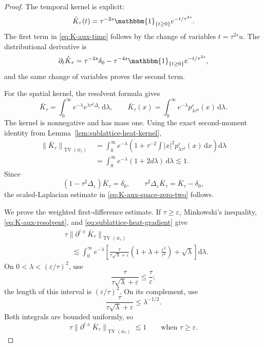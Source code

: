 \documentclass{article}
\numberwithin{equation}{section}
\newcommand{\mathd}{\mathrm{d}}
\theoremstyle{plain}
\theoremstyle{definition}
\begin{document}
\begin{proof}
	The temporal kernel is explicit:
	\[
		\mathring K_\tau(t)
	=
	\tau^{-2s}\mathbbm{1}_{\{t\geq0\}}
	e^{-t/\tau^{2s}}.
	\]
	The first term in \eqref{eq:K-aux-time} follows by the change of variables
	\(t=\tau^{2s}u\).  The distributional derivative is
	\[
		\partial_t\mathring K_\tau
	=
	\tau^{-2s}\delta_0
	-
	\tau^{-4s}\mathbbm{1}_{\{t\geq0\}}
	e^{-t/\tau^{2s}},
	\]
	and the same change of variables proves the second term.
	
	For the spatial kernel, the resolvent formula gives
	\begin{equation}
		\label{eq:K-aux-resolvent}
		\bar K_\tau
		=
		\int_0^\infty e^{-\lambda}
		e^{\lambda\tau^2\Delta_\varepsilon}\,\mathd\lambda,
		\qquad
		\bar K_\tau(x)
		=
		\int_0^\infty e^{-\lambda}
		p_{\lambda\tau^2}^\varepsilon(x)\,\mathd\lambda.
	\end{equation}
	The kernel is nonnegative and has mass one.  Using the exact
	second-moment identity from Lemma~\ref{lem:sublattice-heat-kernel},
	\[
	\begin{aligned}
		\|\bar K_\tau\|_{\operatorname{TV}(\bar w_\tau)}
		&=
		\int_0^\infty e^{-\lambda}
		\left(
		1+\tau^{-2}
		\int|x|^2p_{\lambda\tau^2}^\varepsilon(x)\,\mathd x
		\right)\mathd\lambda
		\\
		&=
		\int_0^\infty e^{-\lambda}(1+2d\lambda)\,\mathd\lambda
		\lesssim1.
	\end{aligned}
	\]
	Since
	\[
	(1-\tau^2\Delta_\varepsilon)\bar K_\tau=\delta_0,
	\qquad
	\tau^2\Delta_\varepsilon\bar K_\tau
	=
	\bar K_\tau-\delta_0,
	\]
	the scaled-Laplacian estimate in
	\eqref{eq:K-aux-space-zero-two} follows.
	
	We prove the weighted first-difference estimate.  If
	\(\tau\geq\varepsilon\), Minkowski's inequality,
	\eqref{eq:K-aux-resolvent}, and
	\eqref{eq:sublattice-heat-gradient} give
	\[
	\begin{aligned}
		&\tau\|\partial^{i\pm}\bar K_\tau\|
		_{\operatorname{TV}(\bar w_\tau)}
		\\
		&\quad\lesssim
		\int_0^\infty e^{-\lambda}
		\left[
		\frac{\tau}{\tau\sqrt\lambda+\varepsilon}
		\left(
		1+\lambda+\frac{\varepsilon^2}{\tau^2}
		\right)
		+\sqrt\lambda
		\right]\mathd\lambda.
	\end{aligned}
	\]
	On \(0<\lambda<(\varepsilon/\tau)^2\), use
	\[
	\frac{\tau}{\tau\sqrt\lambda+\varepsilon}
	\leq\frac{\tau}{\varepsilon};
	\]
	the length of this interval is
	\((\varepsilon/\tau)^2\).  On its complement, use
	\[
	\frac{\tau}{\tau\sqrt\lambda+\varepsilon}
	\leq\lambda^{-1/2}.
	\]
	Both integrals are bounded uniformly, so
	\[
	\tau\|\partial^{i\pm}\bar K_\tau\|
	_{\operatorname{TV}(\bar w_\tau)}
	\lesssim1
	\qquad\text{when }\tau\geq\varepsilon.
	\]
	

\end{proof}
\end{document}
